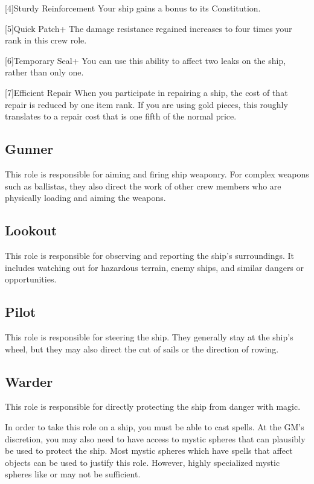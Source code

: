         [4]{Sturdy Reinforcement} Your ship gains a  bonus to its Constitution.

        [5]{Quick Patch+} The damage resistance regained increases to four times your rank in this crew role.

        [6]{Temporary Seal+} You can use this ability to affect two leaks on the ship, rather than only one.

        [7]{Efficient Repair} When you participate in repairing a ship, the cost of that repair is reduced by one item rank.
        If you are using gold pieces, this roughly translates to a repair cost that is one fifth of the normal price.

    \subsection{Gunner}
        This role is responsible for aiming and firing ship weaponry.
        For complex weapons such as ballistas, they also direct the work of other crew members who are physically loading and aiming the weapons.

    \subsection{Lookout}
        This role is responsible for observing and reporting the ship's surroundings.
        It includes watching out for hazardous terrain, enemy ships, and similar dangers or opportunities.

    \subsection{Pilot}
        This role is responsible for steering the ship.
        They generally stay at the ship's wheel, but they may also direct the cut of sails or the direction of rowing.

    \subsection{Warder}
        This role is responsible for directly protecting the ship from danger with magic.

        In order to take this role on a ship, you must be able to cast spells.
        At the GM's discretion, you may also need to have access to mystic spheres that can plausibly be used to protect the ship.
        Most mystic spheres which have spells that affect objects can be used to justify this role.
        However, highly specialized mystic spheres like  or  may not be sufficient.
